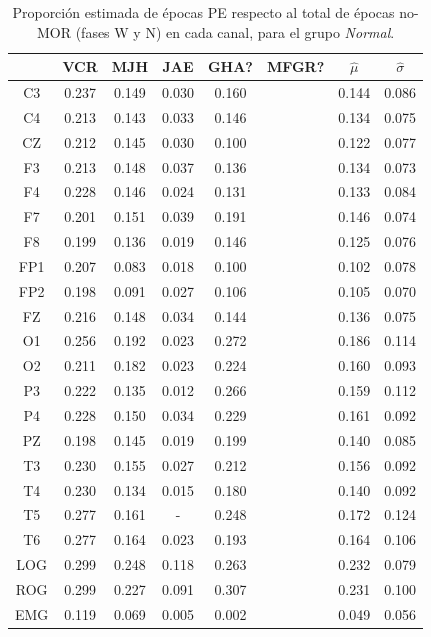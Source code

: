 \begin{table}
\centering
\begin{tabular}{c|ccccc|cc}
& VCR & MJH & JAE & GHA? & MFGR? & $\widehat{\mu}$ & $\widehat{\sigma}$ \\
\hline
 C3 & 0.237    & 0.149    & 0.030    & 0.160    && 0.144    & 0.086    \\ 
 C4 & 0.213    & 0.143    & 0.033    & 0.146    && 0.134    & 0.075     \\
 CZ & 0.212    & 0.145    & 0.030    & 0.100    && 0.122    & 0.077     \\
 F3 & 0.213    & 0.148    & 0.037    & 0.136    && 0.134    & 0.073     \\
 F4 & 0.228    & 0.146    & 0.024    & 0.131    && 0.133    & 0.084     \\
 F7 & 0.201    & 0.151    & 0.039    & 0.191    && 0.146    & 0.074     \\
 F8 & 0.199    & 0.136    & 0.019    & 0.146    && 0.125    & 0.076     \\
 FP1 & 0.207    & 0.083    & 0.018    & 0.100    && 0.102    & 0.078     \\
 FP2 & 0.198    & 0.091    & 0.027    & 0.106    && 0.105    & 0.070     \\
 FZ & 0.216    & 0.148    & 0.034    & 0.144    && 0.136    & 0.075     \\
 O1 & 0.256    & 0.192    & 0.023    & 0.272    && 0.186    & 0.114     \\
 O2 & 0.211    & 0.182    & 0.023    & 0.224    && 0.160    & 0.093     \\
 P3 & 0.222    & 0.135    & 0.012    & 0.266    && 0.159    & 0.112     \\
 P4 & 0.228    & 0.150    & 0.034    & 0.229    && 0.161    & 0.092     \\
 PZ & 0.198    & 0.145    & 0.019    & 0.199    && 0.140    & 0.085     \\
 T3 & 0.230    & 0.155    & 0.027    & 0.212    && 0.156    & 0.092     \\
 T4 & 0.230    & 0.134    & 0.015    & 0.180    && 0.140    & 0.092     \\
 T5 & 0.277    & 0.161    & -      & 0.248    && 0.172    & 0.124     \\
 T6 & 0.277    & 0.164    & 0.023    & 0.193    && 0.164    & 0.106     \\
 LOG & 0.299    & 0.248    & 0.118    & 0.263    && 0.232    & 0.079     \\
 ROG & 0.299    & 0.227    & 0.091    & 0.307    && 0.231    & 0.100     \\
 EMG & 0.119    & 0.069    & 0.005    & 0.002    && 0.049    & 0.056    
\end{tabular}
\caption{Proporci\'on estimada de \'epocas PE respecto al total de \'epocas no-MOR
(fases W y N) en cada
canal, para el grupo \textit{Normal}.}
\label{gpo_NN_nmor}
\end{table}

